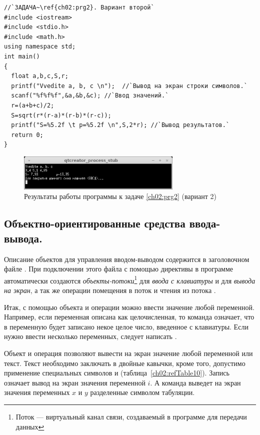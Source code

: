\begin{lstlisting}
//`ЗАДАЧА~\ref{ch02:prg2}. Вариант второй`
#include <iostream>
#include <stdio.h>
#include <math.h>
using namespace std;
int main()
{
  float a,b,c,S,r;
  printf("Vvedite a, b, c \n");  //`Вывод на экран строки символов.`
  scanf("%f%f%f",&a,&b,&c); //`Ввод значений.`
  r=(a+b+c)/2;
  S=sqrt(r*(r-a)*(r-b)*(r-c));
  printf("S=%5.2f \t p=%5.2f \n",S,2*r); //`Вывод результатов.`
  return 0;
}
\end{lstlisting}

\begin{figure}[htb]
\begin{center}
\includegraphics[width=0.7\textwidth]{img/ris_2_8}
\caption{Результаты работы программы к задаче \ref{ch02:prg2} (вариант 2)}
\label{ch02:refDrawing7}
\end{center}
\end{figure}

\subsection[Объектно-ориентированные средства ввода-вывода.]{Объектно-ориентированные средства ввода-вывода.}
Описание объектов для управления вводом-выводом содержится в заголовочном файле . При
подключении этого файла с помощью директивы  в программе
автоматически создаются \emph{объекты-потоки}\footnote{Поток --- виртуальный канал связи, создаваемый в
программе для передачи данных}  для \emph{ввода с клавиатуры} и
 для \emph{вывода на экран}, а так же операции помещения в поток
\Sys{{<}{<}} и чтения из потока \Sys{{>}{>}}.

Итак, с помощью объекта  и операции \Sys{{>}{>}} можно ввести
значение любой переменной. Например, если переменная  описана как целочисленная, то команда
означает, что в переменную  будет записано
некое целое число, введенное с клавиатуры. Если нужно ввести несколько переменных, следует написать
.

Объект  и операция \Sys{{<}{<}} позволяют вывести на экран значение
любой переменной или текст. Текст необходимо заключать в двойные кавычки, кроме того, допустимо применение специальных
символов  и  (таблица~\ref{ch02:refTable10}).
Запись  означает вывод на экран значения переменной
$i$. А команда
 выведет
на экран значения переменных $x$ и $y$ разделенные символом табуляции.

